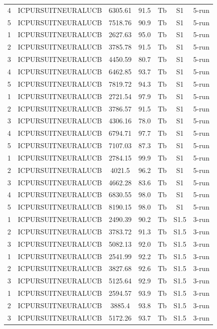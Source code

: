 \documentclass[11pt]{article}
\begin{document}
\begin{center}
\begin{longtable}{|c|c|c|c|c|c|c|}
4 & ICPURSUITNEURALUCB & 6305.61 & 91.5 & Tb & S1 & 5-run \\
5 & ICPURSUITNEURALUCB & 7518.76 & 90.9 & Tb & S1 & 5-run \\
1 & ICPURSUITNEURALUCB & 2627.63 & 95.0 & Tb & S1 & 5-run \\
2 & ICPURSUITNEURALUCB & 3785.78 & 91.5 & Tb & S1 & 5-run \\
3 & ICPURSUITNEURALUCB & 4450.59 & 80.7 & Tb & S1 & 5-run \\
4 & ICPURSUITNEURALUCB & 6462.85 & 93.7 & Tb & S1 & 5-run \\
5 & ICPURSUITNEURALUCB & 7819.72 & 94.3 & Tb & S1 & 5-run \\
1 & ICPURSUITNEURALUCB & 2721.54 & 97.9 & Tb & S1 & 5-run \\
2 & ICPURSUITNEURALUCB & 3786.57 & 91.5 & Tb & S1 & 5-run \\
3 & ICPURSUITNEURALUCB & 4306.16 & 78.0 & Tb & S1 & 5-run \\
4 & ICPURSUITNEURALUCB & 6794.71 & 97.7 & Tb & S1 & 5-run \\
5 & ICPURSUITNEURALUCB & 7107.03 & 87.3 & Tb & S1 & 5-run \\
1 & ICPURSUITNEURALUCB & 2784.15 & 99.9 & Tb & S1 & 5-run \\
2 & ICPURSUITNEURALUCB & 4021.5 & 96.2 & Tb & S1 & 5-run \\
3 & ICPURSUITNEURALUCB & 4662.28 & 83.6 & Tb & S1 & 5-run \\
4 & ICPURSUITNEURALUCB & 6830.55 & 98.0 & Tb & S1 & 5-run \\
5 & ICPURSUITNEURALUCB & 8190.15 & 98.0 & Tb & S1 & 5-run \\
1 & ICPURSUITNEURALUCB & 2490.39 & 90.2 & Tb & S1.5 & 3-run \\
2 & ICPURSUITNEURALUCB & 3783.72 & 91.3 & Tb & S1.5 & 3-run \\
3 & ICPURSUITNEURALUCB & 5082.13 & 92.0 & Tb & S1.5 & 3-run \\
1 & ICPURSUITNEURALUCB & 2541.99 & 92.2 & Tb & S1.5 & 3-run \\
2 & ICPURSUITNEURALUCB & 3827.68 & 92.6 & Tb & S1.5 & 3-run \\
3 & ICPURSUITNEURALUCB & 5125.64 & 92.9 & Tb & S1.5 & 3-run \\
1 & ICPURSUITNEURALUCB & 2594.57 & 93.9 & Tb & S1.5 & 3-run \\
2 & ICPURSUITNEURALUCB & 3885.4 & 93.8 & Tb & S1.5 & 3-run \\
3 & ICPURSUITNEURALUCB & 5172.26 & 93.7 & Tb & S1.5 & 3-run \\

\end{longtable}
\end{center}
\end{document}
